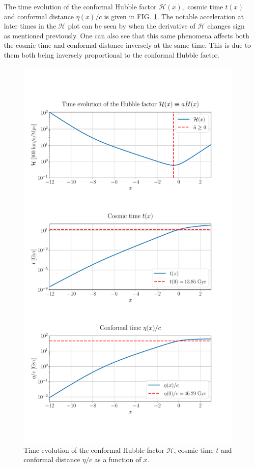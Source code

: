 \documentclass[%
reprint,
 amsmath,amssymb,
 aps,
]{revtex4-2}
\newcommand{\Hp}{\mathcal{H}}
\begin{document}
The time evolution of the conformal Hubble factor $\Hp(x),$ cosmic time $t(x)$ and conformal distance $\eta(x)/c$ is given in FIG. \ref{fig:TimeEvHp}. The notable acceleration at later times in the $\Hp$ plot can be seen by when the derivative of $\Hp$ changes sign as mentioned previously. One can also see that this same phenomena affects both the cosmic time and conformal distance inversely at the same time. This is due to them both being inversely proportional to the conformal Hubble factor.
\begin{figure}[ht!]
	\includegraphics[width = \linewidth]{Figures/merge_Hp_t_eta_Ev.pdf}
	\caption{Time evolution of the conformal Hubble factor $\Hp$, cosmic time $t$ and conformal distance $\eta/c$ as a function of $x$.}
	\label{fig:TimeEvHp}
\end{figure}
\end{document}
